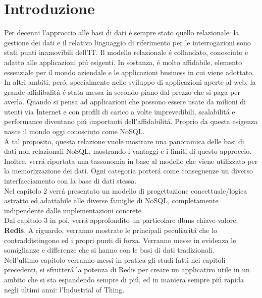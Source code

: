\chapter*{Introduzione}
Per decenni l'approccio alle basi di dati é sempre stato quello relazionale: la gestione dei dati e il relativo
linguaggio di riferimento per le interrogazioni sono stati punti inamovibili dell'IT.
Il modello relazionale é collaudato, conosciuto e adatto alle applicazioni piú esigenti. In sostanza, é molto
affidabile, elemento essenziale per il mondo aziendale e le applicazioni business in cui viene adottato.\\
In altri ambiti, peró, specialmente nello sviluppo di applicazioni aperte al web, la grande affidibalitá é stata
messa in secondo piano dal prezzo che si paga per averla. Quando si pensa ad applicazioni che possono essere
usate da milioni di utenti via Internet e con profili di carico a volte imprevedibili, scalabilitá e performance
diventano piú importanti dell'affidabilitá. Proprio da questa esigenza nasce il mondo oggi conosciuto come NoSQL.\\
A tal proposito, questa relazione vuole mostrare una panoramica delle basi di dati non relazionali NoSQL,
mostrando i vantaggi e i limiti di questo approccio. Inoltre, verrá riportata
una tassonomia in base al modello che viene utilizzato per la memorizzazione dei dati.
Ogni categoria porterá come conseguenze un diverso interfacciamento
con la base di dati stessa.\\
Nel capitolo 2 verrá presentato un modello di progettazione concettuale/logica
astratto ed adattabile alle diverse famiglie di NoSQL, completamente indipendente dalle implementazioni concrete.\\
Dal capitolo 3 in poi, verrá approfondito un particolare dbms chiave-valore: \textbf{Redis}.
A riguardo, verranno mostrate le principali peculiaritá che lo contraddistingono ed i propri punti di forza.
Verranno messe in evidenza le somiglianze e differenze che si hanno con le basi di dati tradizionali.\\
Nell'ultimo capitolo verranno messi in pratica gli studi fatti nei capitoli precedenti, si sfrutterá
la potenza di Redis per creare un applicativo utile in un ambito che si sta espandendo sempre di piú, ed in maniera sempre piú rapida
negli ultimi anni: l'Industrial of Thing.
